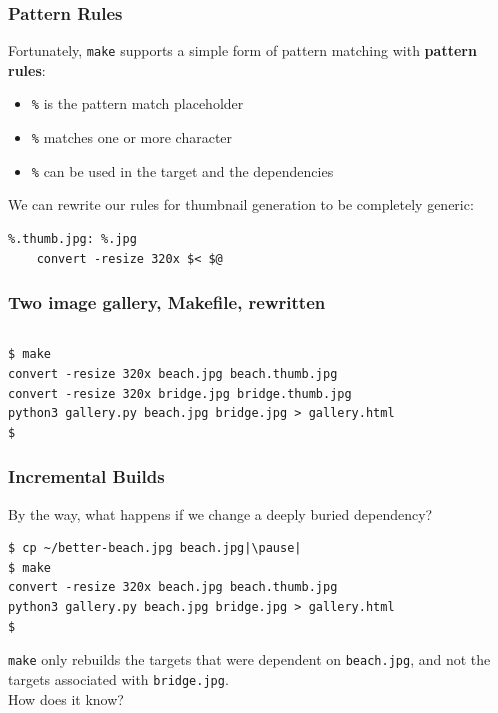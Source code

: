 \documentclass[xcolor=dvipsnames,t,compress]{beamer}
\begin{document}
\begin{frame}[fragile]
\frametitle{Pattern Rules}
\vspace{-0.75em}
Fortunately, \texttt{make} supports a simple form of pattern matching with \textbf{pattern rules}:
\begin{itemize}
\item \texttt{\%} is the pattern match placeholder
\item \texttt{\%} matches one or more character
\item \texttt{\%} can be used in the target and the dependencies
\end{itemize}
\pause
\vspace{0.5em}
We can rewrite our rules for thumbnail generation to be completely generic:
\begin{verbatim}
%.thumb.jpg: %.jpg
	convert -resize 320x $< $@
\end{verbatim}
\end{frame}

\begin{frame}[fragile]
\frametitle{Two image gallery, Makefile, rewritten}
\vspace{-1em}
\inputminted[fontsize=\small,frame=single,tabsize=4]{make}{examples/make/Makefile.4}
\begin{verbatim}
$ make
convert -resize 320x beach.jpg beach.thumb.jpg
convert -resize 320x bridge.jpg bridge.thumb.jpg
python3 gallery.py beach.jpg bridge.jpg > gallery.html
$
\end{verbatim}
\end{frame}

\begin{frame}[fragile]
\frametitle{Incremental Builds}
\vspace{-0.75em}
By the way, what happens if we change a deeply buried dependency?

\begin{verbatim}
$ cp ~/better-beach.jpg beach.jpg|\pause|
$ make
convert -resize 320x beach.jpg beach.thumb.jpg
python3 gallery.py beach.jpg bridge.jpg > gallery.html
$
\end{verbatim}

\texttt{make} only rebuilds the targets that were dependent on \texttt{beach.jpg}, and not the targets associated with \texttt{bridge.jpg}.
\\
\newline
How does it know?
\end{frame}
\end{document}
